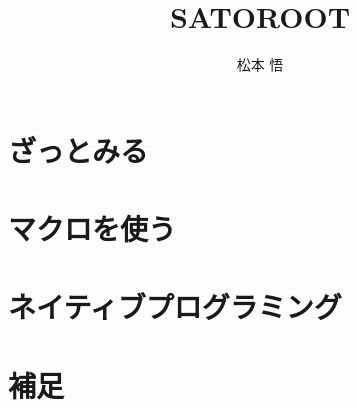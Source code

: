 \documentclass[openany]{report}
\begin{document}
\title{ \fontsize{60pt}{40pt}\selectfont SATOROOT}
\author{松本 悟}
\maketitle

\pagestyle{fancy}
\fancyhead{}
\fancyhead[RO,RE]{\rightmark}
\fancyhead[LE,LO]{\leftmark}
\cfoot{\thepage} 

\renewcommand{\sectionmark}[1]{\markright{\thesection \ \ #1}{}}

\newcommand{\ROOT}{\texttt{ROOT}}
\newcommand{\Cpp}{\texttt{C++}}





\tableofcontents


\setcounter{page}{1}

\chapter{ざっとみる}


\chapter{マクロを使う}













\chapter{ネイティブプログラミング}







\clearpage
\appendix
\chapter{補足}



\end{document}
